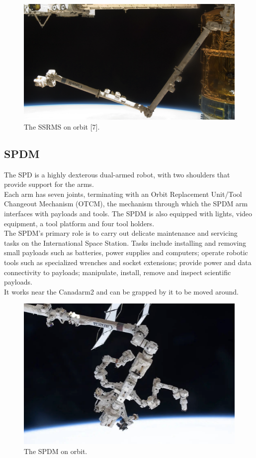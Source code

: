 \documentclass[a4paper,12pt,oneside]{report}
\begin{document}
\begin{figure}[b]
  \centering
  \includegraphics[scale=0.35]{SSRMS_orbit.png}
  \caption{The SSRMS on orbit [7].}
  \label{SSRMS_orbit}
\end{figure}
\newpage
\subsection{SPDM}
The SPD is a highly dexterous dual-armed robot, with two shoulders that provide support for the arms.\\
Each arm has seven joints, terminating with an Orbit Replacement Unit/Tool Changeout Mechanism (OTCM), the mechanism through which the SPDM arm interfaces with payloads and tools. The SPDM is also equipped with lights, video equipment, a tool platform and four tool holders.\\
The SPDM's primary role is to carry out delicate maintenance and servicing tasks on the International Space Station. Tasks include installing and removing small payloads such as batteries, power supplies and computers; operate robotic tools such as specialized wrenches and socket extensions; provide power and data connectivity to payloads; manipulate, install, remove and inspect scientific payloads.\\
It works near the Canadarm2 and can be grapped by it to be moved around.
\begin{figure}[h]
  \centering
  \includegraphics[scale=0.6]{SPDM.png}
  \caption{The SPDM on orbit.}
  \label{SPDM_orbit}
\end{figure}
\end{document}
